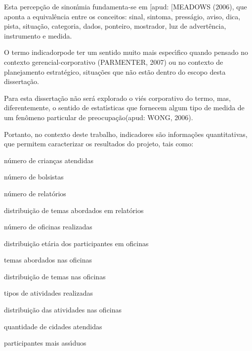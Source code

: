 \documentclass[
12pt,		%
openright,	%
twoside,  %
a4paper,			%
chapter=TITLE,		%
english,			%
french,				%
spanish,			%
brazil				%
]{USPSC-classe/USPSC_RedarTex}
\begin{document}
Esta percep\c{c}\~ao de sinon\'{\i}mia fundamenta-se em [apud: [MEADOWS (2006), que aponta a equival\^encia entre os conceitos: sinal, sintoma, press\'agio, aviso, dica, pista, situa\c{c}\~ao, categoria, dados, ponteiro, mostrador, luz de advert\^encia, instrumento e medida.








O termo \textquotedbl indicador\textquotedbl  pode ter um sentido muito mais espec\'{\i}fico quando pensado no contexto gerencial-corporativo (PARMENTER, 2007) ou no contexto de planejamento estrat\'egico, situa\c{c}\~oes que n\~ao est\~ao dentro do escopo desta disserta\c{c}\~ao.








Para esta disserta\c{c}\~ao n\~ao ser\'a explorado o vi\'es corporativo do termo, mas, diferentemente, o sentido de \textquotedbl estat\'{\i}sticas que fornecem algum tipo de medida de um fen\^omeno particular de preocupa\c{c}\~ao\textquotedbl  (apud: WONG, 2006).








Portanto, no contexto deste trabalho, indicadores s\~ao informa\c{c}\~oes quantitativas, que permitem caracterizar os resultados do projeto, tais como:









\begin{alineas}
\item n\'umero de crian\c{c}as atendidas
\item n\'umero de bolsistas
\item n\'umero de relat\'orios
\item distribui\c{c}\~ao de temas abordados em relat\'orios
\item n\'umero de oficinas realizadas
\item distribui\c{c}\~ao et\'aria dos participantes em oficinas
\item temas abordados nas oficinas
\item distribui\c{c}\~ao de temas nas oficinas
\item tipos de atividades realizadas
\item distribui\c{c}\~ao das atividades nas oficinas
\item quantidade de cidades atendidas
\item participantes mais ass\'{\i}duos
\end{alineas}
\end{document}
